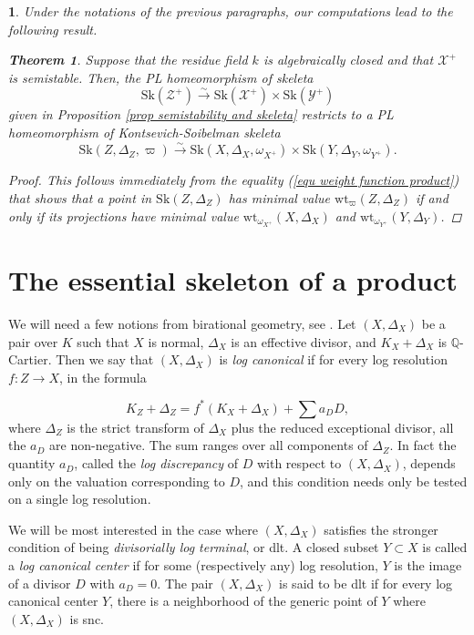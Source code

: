 \documentclass{amsart}%
\numberwithin{equation}{subsection}
\theoremstyle{plain2}
\newtheorem{thm}[equation]{Theorem}
\theoremstyle{definition2}
\theoremstyle{stepstyle}
\theoremstyle{point}
\theoremstyle{subpoint}
\newtheorem{subpoint}[equation]{}%
\newcommand{\spa}[1]{\begin{subpoint}#1\end{subpoint}}           %
\newcommand{\cX}{\ensuremath{\mathscr{X}}}
\newcommand{\cY}{\ensuremath{\mathscr{Y}}}
\newcommand{\cZ}{\ensuremath{\mathscr{Z}}}
\renewcommand{\cY}{\ensuremath{\mathscr{Y}}}
\newcommand{\weight}{\mathrm{wt}}
\newcommand{\Sk}{\mathrm{Sk}}
\begin{document}
\spa{Under the notations of the previous paragraphs, our computations lead to the following result.
\begin{thm}  \label{thm semistability and KS skeleta}
Suppose that the residue field $k$ is algebraically closed and that $\cX^+$ is semistable. Then, the PL homeomorphism of skeleta $$\Sk(\cZ^+) \xrightarrow{\sim} \Sk(\cX^+) \times \Sk(\cY^+)$$ given in Proposition \ref{prop semistability and skeleta} restricts to a PL homeomorphism of Kontsevich-Soibelman skeleta $$\Sk(Z,\Delta_Z, \varpi) \xrightarrow{\sim} \Sk(X,\Delta_X, \omega_{X^+}) \times \Sk(Y,\Delta_Y, \omega_{Y^+}).$$ 
\end{thm}
\begin{proof}
This follows immediately from the equality (\ref{equ weight function product}) that shows that a point in $\Sk(Z,\Delta_Z)$ has minimal value $\weight_{\varpi}(Z,\Delta_Z)$ if and only if its projections have minimal value $\weight_{\omega_{X^+}}(X,\Delta_X)$ and $\weight_{\omega_{Y^+}}(Y,\Delta_Y)$.
\end{proof}
}

\section{The essential skeleton of a product}\label{sec birational}
We will need a few notions from birational geometry, see \cite{KollarMori}. Let $(X,\Delta_X)$ be a pair over $K$ such that $X$ is normal, $\Delta_X$ is an effective divisor, and $K_X+\Delta_X$ is $\mathbb{Q}$-Cartier. Then we say that $(X,\Delta_X)$ is \emph{log canonical} if for every log resolution $f \colon Z \to X$, in the formula

\[
K_Z+\Delta_Z = f^*(K_X+\Delta_X)+\sum a_D D,
\]
where $\Delta_Z$ is the strict transform of $\Delta_X$ plus the reduced exceptional divisor, all the $a_D$ are non-negative. The sum ranges over all components of $\Delta_Z$. In fact the quantity $a_D$, called the \emph{log discrepancy} of $D$ with respect to $(X,\Delta_X)$, depends only on the valuation corresponding to $D$, and this condition needs only be tested on a single log resolution.

We will be most interested in the case where $(X,\Delta_X)$ satisfies the stronger condition of being \emph{divisorially log terminal}, or dlt. A closed subset $Y \subset X$ is called a \emph{log canonical center} if for some (respectively any) log resolution, $Y$ is the image of a divisor $D$ with $a_D=0$. The pair $(X,\Delta_X)$ is said to be dlt if for every log canonical center $Y$, there is a neighborhood of the generic point of $Y$ where $(X,\Delta_X)$ is snc.
\end{document}
